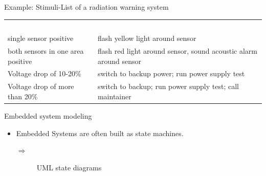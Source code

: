\documentclass[ngerman={babel}, utf8, bigger, t, xcolor={table,dvipsnames}, ompress, hyperref={bookmarks,colorlinks}]{beamer}
\begin{document}
\begin{frame}{Example: Stimuli-List of a radiation warning system}
	\begin{tabular}{p{9em}p{13em}}
		\rowcolor{structure.fg}\hline \textcolor{white}{Stimulus} & \textcolor{white}{Response} \pause \\
		single sensor positive & flash yellow light around sensor \pause \\
		both sensors in one area positive & flash red light around sensor, sound acoustic alarm around sensor \pause \\
		Voltage drop of 10-20\% & switch to backup power; run power supply test \pause \\
		Voltage drop of more than 20\% & switch to backup; run power supply test; call maintainer \\
	\end{tabular}
\end{frame}



\begin{frame}{Embedded system modeling}
	\begin{itemize}
		\item Embedded Systems are often built as state machines.
		\begin{description}
			\item[ $\Rightarrow$] UML state diagrams
		\end{description}
	\end{itemize}
\end{frame}
\end{document}
